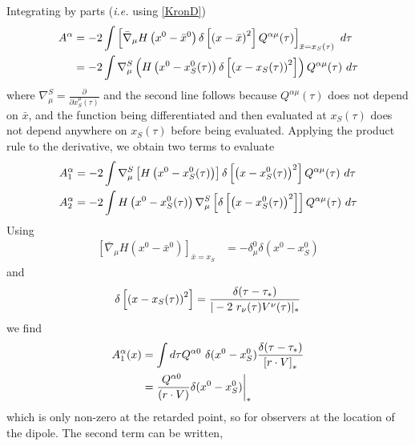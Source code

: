\begin{widetext}
Integrating by parts (\textit{i.e.} using \ref{KronD})
\begin{align}
A^{\alpha} &= -2 \int 
 \left[\bar{\nabla}_{\mu} H \left( x^0  -  \bar{x}^0 \right)  \delta \left[ \left({x}
   -{\bar{x}}\right)^2 \right]  
  Q^{\alpha \mu}(\tau)  \right ]_{\bar{x}=x_S(\tau)}  \hbox{  }  d \tau \nonumber \\
  &= -2 \int 
\nabla^S_{\mu} \left( H \left( x^0  -  x^0_S(\tau) \right)  \delta \left[ \left({x}
   -{x_S(\tau)}\right)^2 \right]  
   \right )  Q^{\alpha \mu}(\tau) \   d \tau 
   \label{AEvalDeriv}
\end{align}
where $\nabla^S_\mu = \frac{\partial}{\partial x^{\mu}_S(\tau)}$ and the second line follows because $Q^{\alpha \mu}(\tau)$ does not depend on $\bar{x}$, and the function being differentiated and then evaluated at $x_S(\tau)$ does not depend anywhere on $x_S(\tau)$ before being evaluated. Applying the product rule to the derivative, we obtain two terms to evaluate
\begin{align}
A_1^{\alpha} &= -2 \int 
\nabla_\mu^S \left[ H \left( x^0  -  x^0_S(\tau) \right) \right] \delta \left[ \left({x}
   -{x^0_S(\tau)}\right)^2 \right]  
  Q^{\alpha \mu}(\tau)  \hbox{  } d \tau  \\
 A_2^{\alpha} &= -2 \int 
 H \left( x^0  -  x^0_S(\tau) \right) \nabla^S_{\mu} \left[ \delta \left[ \left({x}
   -{x^0_S(\tau)}\right)^2 \right]   \right]
  Q^{\alpha \mu}(\tau)  \hbox{ } d \tau  
\end{align}
Using 
\begin{align}
\left [\bar{\nabla}_{\mu} H(x^0-{\bar{x}}^0) \right ]_{\bar x=x_S}
&=-\delta^0_\mu \delta(x^0-x^0_S) 
\label{GradH}
\end{align}
and
\begin{align}
\delta \left[  \left({x} -{x_S}(\tau) \right)^2 \right] =  \frac{ \delta(\tau-\tau_*) }{ | -2 \ r_{\nu}(\tau) V^{\nu}(\tau)|_{*} }
\label{eq:delf2}
\end{align}
we find
\begin{align}
A_1^\alpha(x) & = \int d\tau
 Q^{\alpha 0} \
\delta(x^0-x_S^0)
\frac{\delta(\tau-\tau_*)}{\left[ r \cdot V \right]_{*}} \nonumber \\
&=\frac{Q^{\alpha 0} \
}{\left( r \cdot V \right)} \delta(x^0-x_S^0) \bigg{|}_*
\label{eq:firstterm}
\end{align}
which is only non-zero at the retarded point, so for observers at the location of the dipole. 
The second term can be written,
\begin{align}

\end{align}
\end{widetext}
